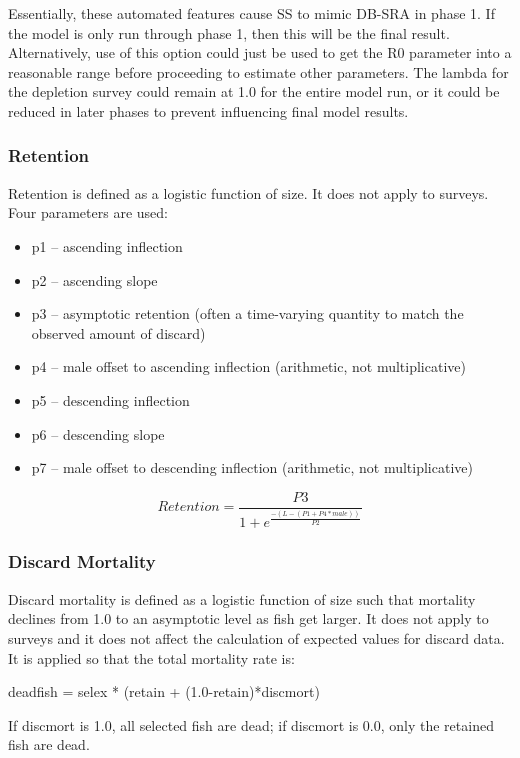 Essentially, these automated features cause SS to mimic DB-SRA in phase 1.  If the model is only run through phase 1, then this will be the final result.  Alternatively, use of this option could just be used to get the R0 parameter into a reasonable range before proceeding to estimate other parameters.  The lambda for the depletion survey could remain at 1.0 for the entire model run, or it could be reduced in later phases to prevent influencing final model results.

\subsubsection{Retention}
Retention is defined as a logistic function of size.  It does not apply to surveys.  Four parameters are used:
\begin{itemize}
	\item p1 – ascending inflection
	\item p2 – ascending slope
	\item p3 – asymptotic retention (often a time-varying quantity to match the observed amount of discard)
	\item p4 – male offset to ascending inflection (arithmetic, not multiplicative)
	\item p5 – descending inflection
	\item p6 – descending slope
	\item p7 – male offset to descending inflection (arithmetic, not multiplicative)
\end{itemize}
\begin{equation}
	Retention = \frac{P3}{1 + e^{\frac{-(L-(P1+P4*male))}{P2}}}
\end{equation}

\subsubsection{Discard Mortality}
Discard mortality is defined as a logistic function of size such that mortality declines from 1.0 to an asymptotic level as fish get larger.  It does not apply to surveys and it does not affect the calculation of expected values for discard data.   It is applied so that the total mortality rate is:\\
\begin{center}
	deadfish = selex * (retain + (1.0-retain)*discmort)
\end{center}
If discmort is 1.0, all selected fish are dead; if discmort is 0.0, only the retained fish are dead.

